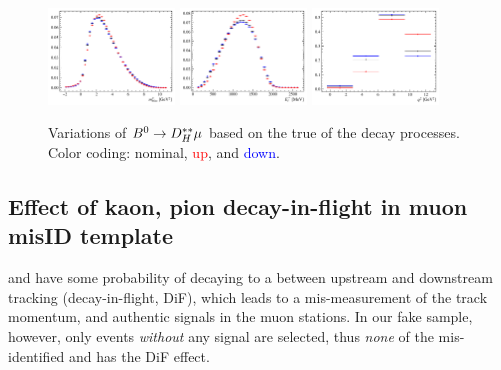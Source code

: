\begin{figure}[!htb]
    \centering
    \includegraphics[width=0.3\textwidth]{./figs-fit-fit-variations/histo-var/D0_iso_DststHMuD0__vs__D0_iso_DststHMuD0_q2m__vs__D0_iso_DststHMuD0_q2p__m2miss.pdf}
    \includegraphics[width=0.3\textwidth]{./figs-fit-fit-variations/histo-var/D0_iso_DststHMuD0__vs__D0_iso_DststHMuD0_q2m__vs__D0_iso_DststHMuD0_q2p__el.pdf}
    \includegraphics[width=0.3\textwidth]{./figs-fit-fit-variations/histo-var/D0_iso_DststHMuD0__vs__D0_iso_DststHMuD0_q2m__vs__D0_iso_DststHMuD0_q2p__q2.pdf}

    \caption{
        Variations of ${{B}^0} \rightarrow D_H^{**}\mu$ based on the true
        \qSq of the decay processes.
        Color coding: nominal, \textcolor{red}{up}, and \textcolor{blue}{down}.
    }
    \label{fig:fit-variations:dstst-heavy}
\end{figure}


\subsection{Effect of kaon, pion decay-in-flight in muon misID template}
\label{ref:fit:var:misid-dif}

\kaon and \pion have some probability of decaying to a \muon between upstream and
downstream tracking (decay-in-flight, DiF),
which leads to a mis-measurement of the track momentum,
and authentic signals in the muon stations.
In our fake \muon sample, however, only events \emph{without} any \muon
signal are selected, thus \emph{none} of the mis-identified \kaon and \pion has
the DiF effect.

